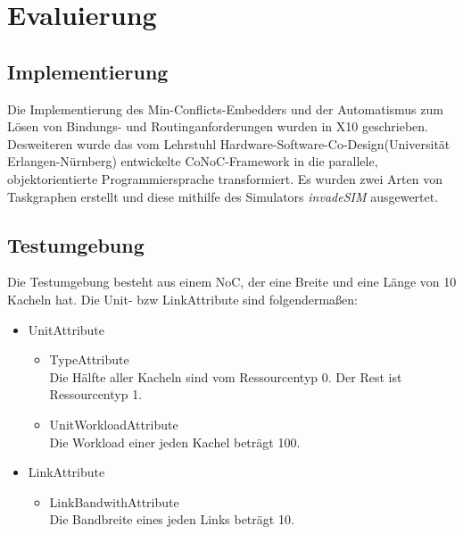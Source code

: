 \chapter{Evaluierung}\label{evaluierung}

\section{Implementierung} \label{Tests}
Die Implementierung des Min-Conflicts-Embedders und der Automatismus zum Lösen von Bindungs- und Routinganforderungen wurden in X10 \cite{x10} geschrieben. Desweiteren wurde das vom Lehrstuhl \grqq Hardware-Software-Co-Design\grqq (Universität Erlangen-Nürnberg) entwickelte CoNoC-Framework in die parallele, objektorientierte Programmiersprache transformiert. Es wurden zwei Arten von Taskgraphen erstellt und diese mithilfe des Simulators \textit{invadeSIM} \cite{invadeSIM}  ausgewertet.





\section{Testumgebung} \label{Testumgebung1} 
Die Testumgebung besteht aus einem NoC, der  eine Breite und eine Länge von 10 Kacheln hat. Die Unit- bzw LinkAttribute sind folgendermaßen:
\\
\begin{itemize}
\item UnitAttribute
\begin{itemize}
\item TypeAttribute\\
Die Hälfte aller Kacheln sind vom Ressourcentyp 0. Der Rest ist Ressourcentyp 1.
\item UnitWorkloadAttribute\\
Die Workload einer jeden Kachel beträgt 100.

\end{itemize}
\item LinkAttribute
\begin{itemize}
\item LinkBandwithAttribute\\
Die Bandbreite eines jeden Links beträgt 10.
\end{itemize}
\end{itemize}

